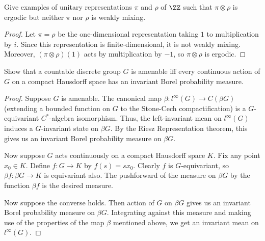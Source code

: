 \documentclass{article}
\begin{document}
 Give examples of unitary representations $\pi$ and $\rho$ of $\ZZ$ such that $\pi \otimes \rho$ is ergodic but neither $\pi$ nor $\rho$ is weakly mixing.
\begin{proof}
Let $\pi = \rho$ be the one-dimensional representation taking $1$ to multiplication by $i$.  Since this representation is finite-dimensional, it is not weakly mixing. Moreover, $(\pi \otimes \rho)(1)$ acts by multiplication by $-1$, so $\pi \otimes \rho$ is ergodic.
\end{proof}

%
%
%
%
%

 Show that a countable discrete group $G$ is amenable iff every continuous action of $G$ on a compact Hausdorff space has an invariant Borel probability measure.
\begin{proof}
Suppose $G$ is amenable.  The canonical map $\beta:l^\infty(G) \to C(\beta G)$ (extending a bounded function on $G$ to the Stone-Cech compactification) is a $G$-equivariant $C^*$-algebra isomorphism. Thus, the left-invariant mean on $l^\infty(G)$ induces a $G$-invariant state on $\beta G$.  By the Riesz Representation theorem, this gives us an invariant Borel probability measure on $\beta G$.

Now  suppose $G$ acts continuously on a compact Hausdorff space $K$. Fix any point $x_0 \in K$. Define $f:G \to K$ by $f(s) = sx_0$. Clearly $f$ is $G$-equivariant, so $\beta f: \beta G \to K$ is equivariant also. The pushforward of the measure on $\beta G$ by the function $\beta f$ is the desired measure.

Now suppose the converse holds. Then action of $G$ on $\beta G$ gives us an invariant Borel probability measure on $\beta G$. Integrating against this measure and making use of the properties of the map $\beta$ mentioned above, we get an invariant mean on $l^\infty(G)$.
\end{proof}
\end{document}
